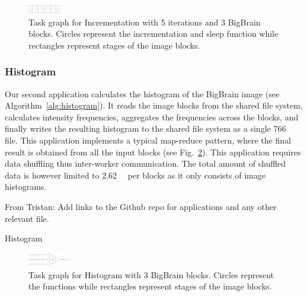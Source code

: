 \documentclass[conference]{IEEEtran}
\newcommand{\TG}[1]{\color{cyan}From Tristan: #1 \color{black}}
\begin{document}
\begin{figure}[!b]
    \centering
    \includegraphics[width=0.125\textwidth,
    angle=-90]{images/incrementation-task-graph.png}
    \caption{Task graph for Incrementation with 5 iterations and 3 BigBrain blocks.
    Circles represent the incrementation and sleep function while rectangles
    represent stages of the image blocks.}\label{fig:tg-inc}
\end{figure}

\subsubsection{Histogram}

 Our second application calculates the histogram of the BigBrain image (see
 Algorithm~\ref{alg:histogram}). It reads the image blocks from the shared file
 system, calculates intensity frequencies, aggregates the frequencies across the
 blocks, and finally writes the resulting histogram to the shared file system as a
 single \SI{766}{\kilo\byte} file. This application implements a typical map-reduce
 pattern, where the final result is obtained from all the input blocks (see
 Fig.~\ref{fig:tg-histo}). This application requires data shuffling thus inter-worker
 communication. The total amount of shuffled data is however limited to
 \SI{2.62}{\mega\byte} per blocks as it only consists of image histograms.

 \TG{Add links to the Github repo for applications and any other relevant file.}

\begin{algorithm}[!t]
    \caption{Histogram}\label{alg:histogram}
    \begin{algorithmic}
    \EndFor
    

    \end{algorithmic}
\end{algorithm}

\begin{figure}[!t]
    \centering
    \includegraphics[width=0.16\textwidth, angle=-90]{images/histogram-task-graph.png}
    \caption{Task graph for Histogram with 3 BigBrain blocks. Circles represent the
    functions while rectangles represent stages of the image blocks.
    }\label{fig:tg-histo}
\end{figure}
\end{document}

